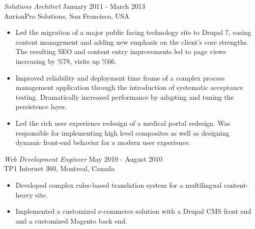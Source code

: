 \documentclass[line,margin]{res}
\begin{document}
\begin{resume}
{\sl Solutions Architect} \hfill January 2011 - March 2013 \\
                AurionPro Solutions, 
                San Francisco, USA
                 \vspace{-5mm}
                 \begin{itemize}  \itemsep -2pt %
                 \item Led the migration of a major public facing technology
                 site to Drupal 7, easing content management and adding new
                 emphasis on the client's core strengths. The resulting
                 SEO and content entry improvements led to
                 page views increasing by \%78, visits up \%66.
                 \item Improved reliability and deployment time frame of a
                 complex process management application through the introduction
                 of systematic acceptance testing. Dramatically increased
                 performance by adapting and tuning the persistence layer.
                 \item Led the rich user experience redesign of a medical
                 portal redesign. Was responsible for implementing high level
                 composites as well as designing dynamic front-end behavior
                 for a modern user experience.
                 \end{itemize}
                    
{\sl Web Development Engineer} \hfill May 2010 - August 2010\\
                TP1 Internet 360, 
                Montreal, Canada
                 \vspace{-5mm}
                 \begin{itemize}  \itemsep -2pt %
                 \item Developed complex rules-based translation system for a
                 multilingual content-heavy site.
                 \item Implemented a customized e-commerce solution with a
                 Drupal CMS front end and a customized Magento back end.
                 \end{itemize}


\end{resume}
\end{document}
